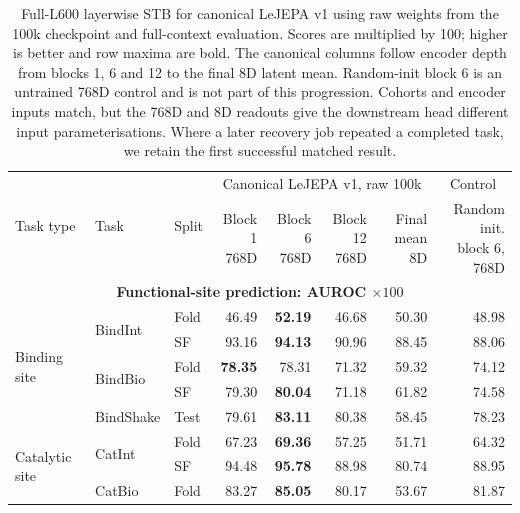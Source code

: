 \begin{table}[p]
\centering
\resultstableformat
\setlength{\tabcolsep}{1.8pt}
\renewcommand{\arraystretch}{0.86}
\caption{Full-L600 layerwise STB for canonical LeJEPA v1 using raw weights from the 100k checkpoint and full-context evaluation. Scores are multiplied by 100; higher is better and row maxima are bold. The canonical columns follow encoder depth from blocks 1, 6 and 12 to the final 8D latent mean. Random-init block 6 is an untrained 768D control and is not part of this progression. Cohorts and encoder inputs match, but the 768D and 8D readouts give the downstream head different input parameterisations. Where a later recovery job repeated a completed task, we retain the first successful matched result.}
\label{tab:results-layer-stb}
\begin{tabular}{@{}lllrrrrr@{}}
\toprule
\multirow{2}{*}{Task type} & \multirow{2}{*}{Task} & \multirow{2}{*}{Split} & \multicolumn{4}{c}{Canonical LeJEPA v1, raw 100k} & \multicolumn{1}{c}{Control} \\[1.8pt]
& & & \shortstack{Block 1\\768D} & \shortstack{Block 6\\768D} & \shortstack{Block 12\\768D} & \shortstack{Final mean\\8D} & \shortstack{Random init.\\block 6, 768D} \\
\midrule
\multicolumn{8}{c}{\textbf{Functional-site prediction: AUROC $\times100$}} \\
\midrule
\multirow{5}{*}{Binding site}
& \multirow{2}{*}{BindInt} & Fold & 46.49 & \textbf{52.19} & 46.68 & 50.30 & 48.98 \\
& & SF & 93.16 & \textbf{94.13} & 90.96 & 88.45 & 88.06 \\
& \multirow{2}{*}{BindBio} & Fold & \textbf{78.35} & 78.31 & 71.32 & 59.32 & 74.12 \\
& & SF & 79.30 & \textbf{80.04} & 71.18 & 61.82 & 74.58 \\
& BindShake & Test & 79.61 & \textbf{83.11} & 80.38 & 58.45 & 78.23 \\
\multirow{4}{*}{Catalytic site}
& \multirow{2}{*}{CatInt} & Fold & 67.23 & \textbf{69.36} & 57.25 & 51.71 & 64.32 \\
& & SF & 94.48 & \textbf{95.78} & 88.98 & 80.74 & 88.95 \\
& \multirow{2}{*}{CatBio} & Fold & 83.27 & \textbf{85.05} & 80.17 & 53.67 & 81.87 \\

\end{tabular}
\end{table}
